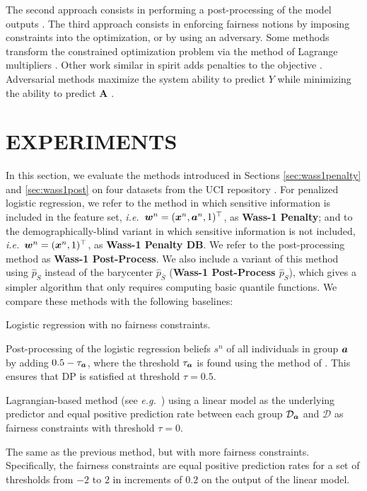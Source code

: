 \documentclass[letterpaper]{article}
\newcommand{\ie}{\emph{i.e.}}
\newcommand{\eg}{\emph{e.g.}}
\theoremstyle{definition}
\newcommand{\vA}{\bm{A}}
\newcommand{\bS}{\bar{S}}
\begin{document}
The second approach consists in performing a post-processing of the model outputs \citep{chiappa19path,doherty12information,feldman15computational,hardt16equality,kusner17counterfactual}. 
The third approach consists in enforcing fairness notions by imposing constraints into the optimization, or by using an adversary. Some methods transform the constrained optimization problem via the method of Lagrange multipliers \citep{goh16satisfying,zafar17fairness,wu18preventing,agarwal18reduction,cotter18two,corbett-davies17algorithmic,narasimhan18learning}.
Other work similar in spirit adds penalties to the objective \citep{komiyama18nonconvex, donini18empirical}. Adversarial methods maximize the system ability to predict
$Y$ while minimizing the ability to predict $\vA$ \citep{zhang18mitigating}. 

\section{EXPERIMENTS}\label{sec:experiments}
In this section, we evaluate the methods introduced in Sections \ref{sec:wass1penalty} and \ref{sec:wass1post} on four datasets from the UCI repository \citep{lichman13uci}. For penalized logistic regression, we refer to the method in which sensitive information is included in the feature set, \ie~${\bm{w}}^n=({\bm{x}}^n, {\bm{a}}^n, 1)^\top$, as {\bf Wass-1 Penalty}; and to the demographically-blind variant in which sensitive information is not included, \ie~${\bm{w}}^n=({\bm{x}}^n, 1)^\top$, as {\bf Wass-1 Penalty DB}. We refer to the post-processing method as {\bf Wass-1 Post-Process}.
We also include a variant of this method using $\hat p_S$ instead of the barycenter $\hat p_{\bS}$ ({\bf Wass-1 Post-Process $\hat p_S$}), which gives a simpler algorithm that only requires computing basic quantile functions. We compare these methods with the following baselines:
\begin{description}[leftmargin=*]
\setlength{\itemsep}{-6pt}  
\setlength{\parskip}{-4pt}
\setlength{\parsep}{-4pt}
\item[{\bf Unconstrained}:] Logistic regression with no fairness constraints.\\
\item[{\bf Hardt's Post-Process}:] Post-processing of the logistic regression beliefs $s^n$ of all individuals in group ${\bm{a}}$ by adding $0.5 - \tau_{{\bm{a}}}$, where the threshold $\tau_{{\bm{a}}}$ is found using the method of \citet{hardt16equality}. This ensures that DP is satisfied at threshold $\tau=0.5$.\\
\item[{\bf Constrained Optimization:}] Lagrangian-based method (see \eg~\cite{eban17scalable,goh16satisfying}) using a linear model as the underlying predictor and equal positive prediction rate between each group $\mathcal{D}_{{\bm{a}}}$ and $\mathcal{D}$ as fairness constraints with threshold $\tau=0$.\\
\item[{\bf Adv. Constr. Opt.:}] The same as the previous method, but with more fairness constraints. Specifically, the fairness constraints are equal positive prediction rates for a set of thresholds from $-2$ to $2$ in increments of $0.2$ on the output of the linear model.
\end{description}
\end{document}
